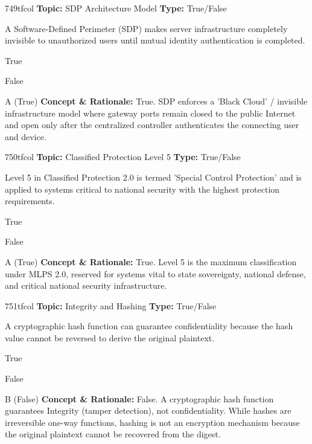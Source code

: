 \begin{qcard}{749}{tfcol}
\textcolor{darkslate!75}{\small\textbf{Topic:} SDP Architecture Model \hfill \textbf{Type:} True/False}\vspace{0.4em}\par
A Software-Defined Perimeter (SDP) makes server infrastructure completely invisible to unauthorized users until mutual identity authentication is completed.
\begin{qoptions}
\item True
\item False
\end{qoptions}
\end{qcard}
\nopagebreak
\begin{explainbox}{A (True)}
\textbf{Concept \& Rationale:} True. SDP enforces a 'Black Cloud' / invisible infrastructure model where gateway ports remain closed to the public Internet and open only after the centralized controller authenticates the connecting user and device.
\end{explainbox}

\begin{qcard}{750}{tfcol}
\textcolor{darkslate!75}{\small\textbf{Topic:} Classified Protection Level 5 \hfill \textbf{Type:} True/False}\vspace{0.4em}\par
Level 5 in Classified Protection 2.0 is termed 'Special Control Protection' and is applied to systems critical to national security with the highest protection requirements.
\begin{qoptions}
\item True
\item False
\end{qoptions}
\end{qcard}
\nopagebreak
\begin{explainbox}{A (True)}
\textbf{Concept \& Rationale:} True. Level 5 is the maximum classification under MLPS 2.0, reserved for systems vital to state sovereignty, national defense, and critical national security infrastructure.
\end{explainbox}

\begin{qcard}{751}{tfcol}
\textcolor{darkslate!75}{\small\textbf{Topic:} Integrity and Hashing \hfill \textbf{Type:} True/False}\vspace{0.4em}\par
A cryptographic hash function can guarantee confidentiality because the hash value cannot be reversed to derive the original plaintext.
\begin{qoptions}
\item True
\item False
\end{qoptions}
\end{qcard}
\nopagebreak
\begin{explainbox}{B (False)}
\textbf{Concept \& Rationale:} False. A cryptographic hash function guarantees Integrity (tamper detection), not confidentiality. While hashes are irreversible one-way functions, hashing is not an encryption mechanism because the original plaintext cannot be recovered from the digest.
\end{explainbox}

